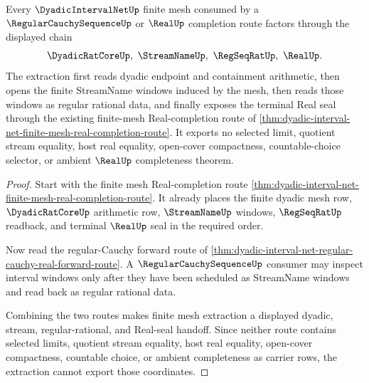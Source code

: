 \begin{theorem}
\label{thm:dyadic-interval-net-finite-mesh-extraction}
Every $\DyadicIntervalNetUp$ finite mesh consumed by a $\RegularCauchySequenceUp$ or $\RealUp$ completion route factors through the displayed chain
$$
\DyadicRatCoreUp,\ \StreamNameUp,\ \RegSeqRatUp,\ \RealUp .
$$
The extraction first reads dyadic endpoint and containment arithmetic, then opens the finite StreamName windows induced by the mesh, then reads those windows as regular rational data, and finally exposes the terminal Real seal through the existing finite-mesh Real-completion route of \autoref{thm:dyadic-interval-net-finite-mesh-real-completion-route}. It exports no selected limit, quotient stream equality, host real equality, open-cover compactness, countable-choice selector, or ambient $\RealUp$ completeness theorem.
\end{theorem}
\begin{proof}
Start with the finite mesh Real-completion route \autoref{thm:dyadic-interval-net-finite-mesh-real-completion-route}. It already places the finite dyadic mesh row, $\DyadicRatCoreUp$ arithmetic row, $\StreamNameUp$ windows, $\RegSeqRatUp$ readback, and terminal $\RealUp$ seal in the required order.

Now read the regular-Cauchy forward route of \autoref{thm:dyadic-interval-net-regular-cauchy-real-forward-route}. A $\RegularCauchySequenceUp$ consumer may inspect interval windows only after they have been scheduled as StreamName windows and read back as regular rational data.

Combining the two routes makes finite mesh extraction a displayed dyadic, stream, regular-rational, and Real-seal handoff. Since neither route contains selected limits, quotient stream equality, host real equality, open-cover compactness, countable choice, or ambient completeness as carrier rows, the extraction cannot export those coordinates.
\end{proof}
